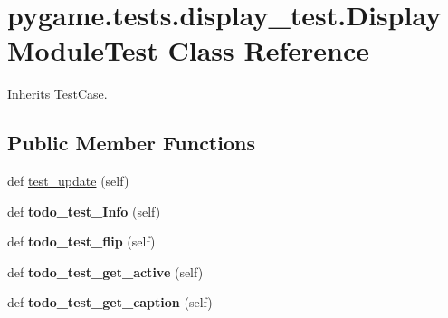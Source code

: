 \hypertarget{classpygame_1_1tests_1_1display__test_1_1_display_module_test}{}\section{pygame.\+tests.\+display\+\_\+test.\+Display\+Module\+Test Class Reference}
\label{classpygame_1_1tests_1_1display__test_1_1_display_module_test}


Inherits Test\+Case.

\subsection*{Public Member Functions}
\begin{DoxyCompactItemize}
\item 
def \hyperlink{classpygame_1_1tests_1_1display__test_1_1_display_module_test_abaaba357fe0822f6010a6b1b8ad6cccf}{test\+\_\+update} (self)
\item 
\mbox{\label{classpygame_1_1tests_1_1display__test_1_1_display_module_test_ab0b14fa331c10858fa9b1bb8af12af2e}} 
def {\bfseries todo\+\_\+test\+\_\+\+Info} (self)
\item 
\mbox{\label{classpygame_1_1tests_1_1display__test_1_1_display_module_test_a72afcaa7f5c36e344e7c154c16b34a1b}} 
def {\bfseries todo\+\_\+test\+\_\+flip} (self)
\item 
\mbox{\label{classpygame_1_1tests_1_1display__test_1_1_display_module_test_a528355432483953b665c847d965572a3}} 
def {\bfseries todo\+\_\+test\+\_\+get\+\_\+active} (self)
\item 
\mbox{\label{classpygame_1_1tests_1_1display__test_1_1_display_module_test_a91bc4de9ddb8091e12a167193cb9547e}} 
def {\bfseries todo\+\_\+test\+\_\+get\+\_\+caption} (self)
\item 
\mbox{\label{classpygame_1_1tests_1_1display__test_1_1_display_module_test_a71abc50381ad574397784e861a8dbc5d}} 

\end{DoxyCompactItemize}
